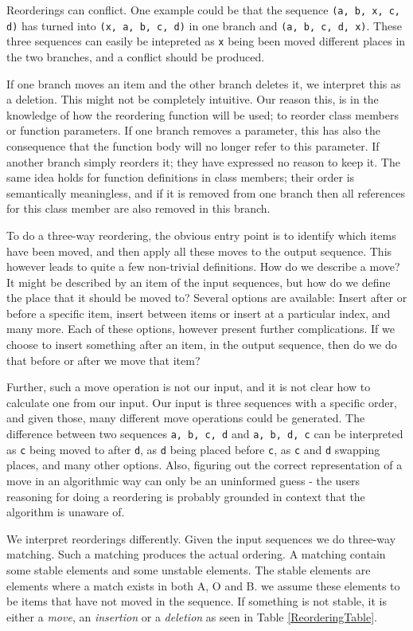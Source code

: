 \documentclass[11pt]{article}
\begin{document}
Reorderings can conflict. One example could be that the sequence \texttt{(a, b, x, c, d)} has turned into \texttt{(x, a, b, c, d)} in one branch and \texttt{(a, b, c, d, x)}. These three sequences can easily be intepreted as \texttt{x} being been moved different places in the two branches, and a conflict should be produced.

If one branch moves an item and the other branch deletes it, we interpret this as a deletion. This might not be completely intuitive. Our reason this, is in the knowledge of how the reordering function will be used; to reorder class members or function parameters. If one branch removes a parameter, this has also the consequence that the function body will no longer refer to this parameter. If another branch simply reorders it; they have expressed no reason to keep it. The same idea holds for function definitions in class members; their order is semantically meaningless, and if it is removed from one branch then all references for this class member are also removed in this branch.

To do a three-way reordering, the obvious entry point is to identify which items have been moved, and then apply all these moves to the output sequence. This however leads to quite a few non-trivial definitions. How do we describe a move? It might be described by an item of the input sequences, but how do we define the place that it should be moved to? Several options are available: Insert after or before a specific item, insert between items or insert at a particular index, and many more. Each of these options, however present further complications. If we choose to insert something after an item, in the output sequence, then do we do that before or after we move that item?

Further, such a move operation is not our input, and it is not clear how to calculate one from our input. Our input is three sequences with a specific order, and given those, many different move operations could be generated. The difference between two sequences \texttt{a, b, c, d} and \texttt{a, b, d, c} can be interpreted as \texttt{c} being moved to after \texttt{d}, as \texttt{d} being placed before \texttt{c}, as \texttt{c} and \texttt{d} swapping places, and many other options. Also, figuring out the correct representation of a move in an algorithmic way can only be an uninformed guess - the users reasoning for doing a reordering is probably grounded in context that the algorithm is unaware of.

We interpret reorderings differently. Given the input sequences we do three-way matching. Such a matching produces the actual ordering. A matching contain some stable elements and some unstable elements. The stable elements are elements where a match exists in both A, O and B. we assume these elements to be items that have not moved in the sequence. If something is not stable, it is either a \textit{move}, an \textit{insertion} or a \textit{deletion} as seen in Table \ref{ReorderingTable}.
\end{document}
